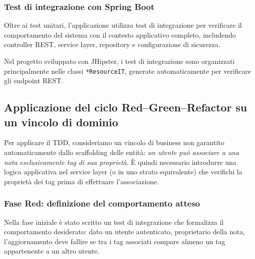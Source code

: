 \subsubsection{Test di integrazione con Spring Boot}
\label{sec:integration-test}

Oltre ai test unitari, l'applicazione utilizza test di integrazione per verificare il comportamento del sistema con il contesto applicativo completo, includendo controller REST, service layer, repository e configurazione di sicurezza.

Nel progetto sviluppato con JHipster, i test di integrazione sono organizzati principalmente nelle classi \texttt{*ResourceIT}, generate automaticamente per verificare gli endpoint REST.

\subsection{Applicazione del ciclo Red--Green--Refactor su un vincolo di dominio}
\label{subsec:red-green-refactor}

Per applicare il TDD, consideriamo un vincolo di business non garantito automaticamente dallo scaffolding delle entità: \emph{un utente può associare a una nota esclusivamente tag di sua proprietà}. È quindi necessario introdurre una logica applicativa nel service layer (o in uno strato equivalente) che verifichi la proprietà dei tag prima di effettuare l’associazione.

\subsubsection{Fase Red: definizione del comportamento atteso}
\label{subsec:red}

Nella fase iniziale è stato scritto un test di integrazione che formalizza il comportamento desiderato: dato un utente autenticato, proprietario della nota, l'aggiornamento deve fallire se tra i tag associati compare almeno un tag appartenente a un altro utente.

